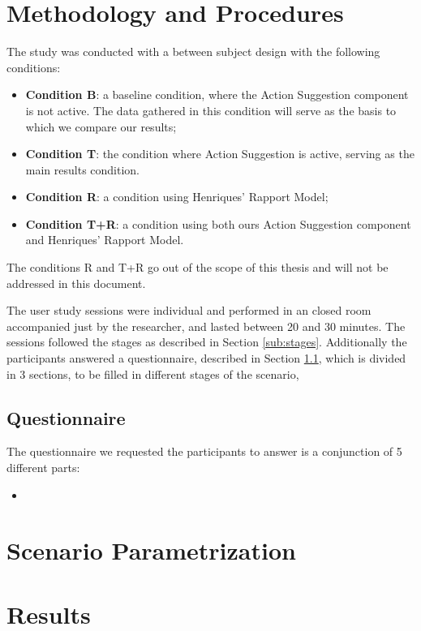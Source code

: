 \section{Methodology and Procedures}
The study was conducted with a between subject design with the following conditions:
\begin{itemize}
    \item \textbf{Condition B}: a baseline condition, where the Action Suggestion component is not active. The data gathered in this condition will serve as the basis to which we compare our results;
    \item \textbf{Condition T}: the condition where Action Suggestion is active, serving as the main results condition.
    \item \textbf{Condition R}: a condition using Henriques' Rapport Model;
    \item \textbf{Condition T+R}: a condition using both ours Action Suggestion component and Henriques' Rapport Model.
\end{itemize}

The conditions R and T+R go out of the scope of this thesis and will not be addressed in this document.

The user study sessions were individual and performed in an closed room accompanied just by the researcher, and lasted between 20 and 30 minutes. The sessions followed the stages as described in Section \ref{sub:stages}. Additionally the participants answered a questionnaire, described in Section \ref{subsec:Questionnaire}, which is divided in 3 sections, to be filled in different stages of the scenario,

\subsection{Questionnaire}
\label{subsec:Questionnaire}
The questionnaire we requested the participants to answer is a conjunction of 5 different parts:

\begin{itemize}
    \item 
\end{itemize}

\section{Scenario Parametrization}



\section{Results}

